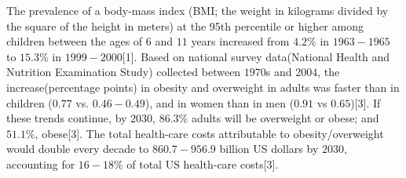 \documentclass[11pt]{article}  %
\begin{document}
The prevalence of a body-mass index (BMI; the weight in kilograms divided by the square of the height in meters) at the 95th percentile or higher among children between the ages of $6$ and $11$ years increased from $4.2\%$ in $1963-1965$ to $15.3\%$ in $1999-2000$[1]. Based on national survey data(National Health and Nutrition Examination Study) collected between $1970$s and $2004$, the increase(percentage points) in obesity and overweight in adults was faster than in children ($0.77$ vs. $0.46-0.49$), and in women than in men ($0.91$ vs $0.65$)[3]. If these trends continue, by $2030$, $86.3\%$ adults will be overweight or obese; and $51.1\%$, obese[3]. The total health-care costs attributable to obesity/overweight would double every decade to $860.7-956.9$ billion US dollars by $2030$, accounting for $16-18\%$ of total US health-care costs[3].\\
\end{document}
